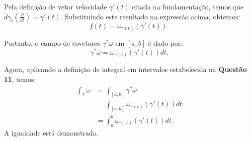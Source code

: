 {	Pela definição de vetor velocidade $\gamma'(t)$ citada na fundamentação, temos que $d\gamma_t(\tfrac{\partial}{\partial t}) = \gamma'(t)$. Substituindo este resultado na expressão acima, obtemos:
	\begin{equation*}
		f(t) = \omega_{\gamma(t)}(\gamma'(t)).
	\end{equation*}
	
	Portanto, o campo de covetores $\gamma^* \omega$ em $[a,b]$ é dado por:
	\begin{equation*}
		\gamma^* \omega = \omega_{\gamma(t)}(\gamma'(t)) dt.
	\end{equation*}
	
	Agora, aplicando a definição de integral em intervalos estabelecida na \textbf{Questão 11}, temos:
	\begin{align*}
		\int_\gamma \omega &= \int_{[a,b]} \gamma^* \omega \\
		&= \int_{[a,b]} \omega_{\gamma(t)}(\gamma'(t)) dt \\
		&= \int_a^b \omega_{\gamma(t)}(\gamma'(t)) dt.
	\end{align*}
	A igualdade está demonstrada.
}


